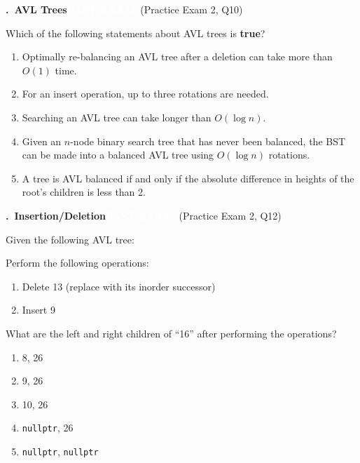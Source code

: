 \documentclass[11pt]{article}
\newcounter{qnum}
\newcommand{\tagpast}[1]{\colorbox{pastc}{\textcolor{white}{\footnotesize\textbf{PAST EXAM}}}\ {\footnotesize\textcolor{pastc}{(#1)}}}
\newcommand{\question}[2]{\par\needspace{8\baselineskip}\medskip\stepcounter{qnum}%
  \noindent\textbf{\theqnum.\ #1}\hfill #2\par\nobreak\smallskip}
\newenvironment{choices}{\begin{enumerate}[label=\textbf{\Alph*)}, nosep, leftmargin=2.5em]}{\end{enumerate}}
\begin{document}
\question{AVL Trees}{\tagpast{Practice Exam 2, Q10}}
Which of the following statements about AVL trees is \textbf{true}?
\begin{choices}
  \item Optimally re-balancing an AVL tree after a deletion can take more than $O(1)$ time.
  \item For an insert operation, up to three rotations are needed.
  \item Searching an AVL tree can take longer than $O(\log n)$.
  \item Given an $n$-node binary search tree that has never been balanced, the BST can be made into a
        balanced AVL tree using $O(\log n)$ rotations.
  \item A tree is AVL balanced if and only if the absolute difference in heights of the root's children is less than 2.
\end{choices}

\question{Insertion/Deletion}{\tagpast{Practice Exam 2, Q12}}
Given the following AVL tree:
\begin{center}
\end{center}
Perform the following operations:
\begin{enumerate}[nosep]
  \item Delete 13 (replace with its inorder successor)
  \item Insert 9
\end{enumerate}
What are the left and right children of ``16'' after performing the operations?
\begin{choices}
  \item 8, 26
  \item 9, 26
  \item 10, 26
  \item \texttt{nullptr}, 26
  \item \texttt{nullptr}, \texttt{nullptr}
\end{choices}
\end{document}
